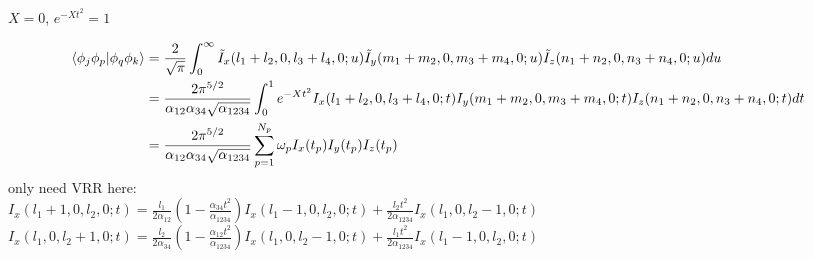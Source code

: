 \documentclass{article}
\begin{document}
	\begin{center}
		$ X=0 $, $ e^{-Xt^2}=1 $
	\end{center}
	\begin{displaymath}
		\begin{aligned}
			\braket{\phi_j\phi_p|\phi_q\phi_k}&=\frac{2}{\sqrt{\pi}} \int_0^{\infty} \tilde{I}_x(l_1+l_2,0,l_3+l_4,0;u)
			\tilde{I}_y(m_1+m_2,0,m_3+m_4,0;u) \tilde{I}_z(n_1+n_2,0,n_3+n_4,0;u) du\\
			&=\frac{2\pi^{5/2}}{\alpha_{12}\alpha_{34}\sqrt{\alpha_{1234}}}
			\int_0^1 e^{-Xt^2} I_x(l_1+l_2,0,l_3+l_4,0;t) I_y(m_1+m_2,0,m_3+m_4,0;t) I_z(n_1+n_2,0,n_3+n_4,0;t) dt\\
			&=\frac{2\pi^{5/2}}{\alpha_{12}\alpha_{34}\sqrt{\alpha_{1234}}}
			\sum_{p=1}^{N_p} \omega_p I_x(t_p) I_y(t_p) I_z(t_p)\\
		\end{aligned}
	\end{displaymath}
	only need VRR here:\\
		$ I_x(l_1+1,0,l_2,0;t)=\frac{l_1}{2\alpha_{12}}(1-\frac{\alpha_{34} t^2}{\alpha_{1234}}) I_x(l_1-1,0,l_2,0;t)
		+\frac{l_2 t^2}{2\alpha_{1234}} I_x(l_1,0,l_2-1,0;t) $\\
		$ I_x(l_1,0,l_2+1,0;t)=\frac{l_2}{2\alpha_{34}}(1-\frac{\alpha_{12} t^2}{\alpha_{1234}}) I_x(l_1,0,l_2-1,0;t)
		+\frac{l_1 t^2}{2\alpha_{1234}} I_x(l_1-1,0,l_2,0;t) $
\end{document}
